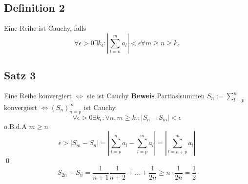 \documentclass[fleqn]{scrbook}
\renewenvironment{proof}{{\bfseries Beweis }}{\qed}
\begin{document}
    \subsection{Definition 2} Eine Reihe ist Cauchy, falls $$\forall\epsilon > 0 \exists k_\epsilon: |\sum^m_{l=n} a_l| <\epsilon \forall m\geq n \geq k_\epsilon$$
    \subsection{Satz 3} Eine Reihe konvergiert $\Leftrightarrow$ sie ist Cauchy
      \begin{proof}
	Partiaslsummen $S_n := \sum^n_{l=p}$ konvergiert $\Leftrightarrow (S_n)^\infty_{n=p}$ ist Cauchy.
	  $$\forall \epsilon > 0 \exists k_\epsilon: \forall n,m \geq k_\epsilon: |S_n - S_m| < \epsilon$$ 
	    o.B.d.A  $m\geq n$
	  $$\epsilon > |S_m - S_n| = |\sum^n_{l=p} a_l - \sum^m_{l=p} a_l| = |\sum^m_{l=n+p} a_l|$$
      \end{proof}
      $$S_{2n} - S_n = \frac{1}{n+1} \frac{1}{n+2} + \ldots + \frac{1}{2n} \geq n \cdot \frac{1}{2n} = \frac{1}{2}$$
\end{document}
